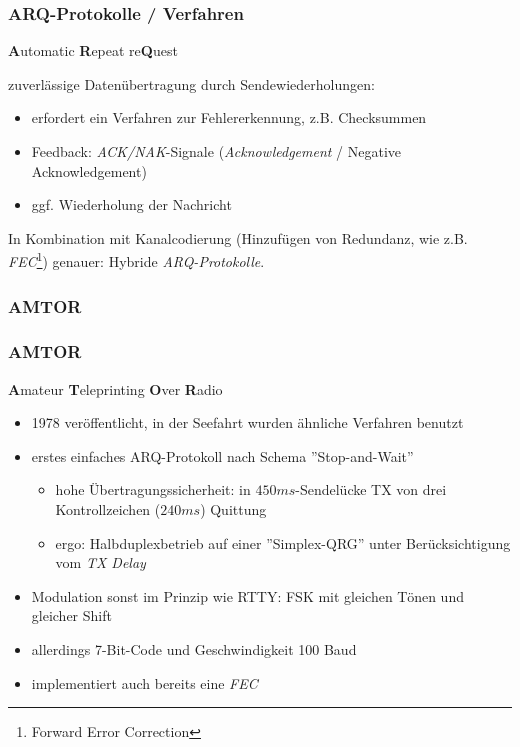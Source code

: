 \begin{frame}
    \frametitle{ARQ-Protokolle / Verfahren}

    \textbf{A}utomatic \textbf{R}epeat re\textbf{Q}uest

    zuverlässige Datenübertragung durch Sendewiederholungen:

    \begin{itemize}
        \item erfordert ein Verfahren zur Fehlererkennung, z.B. Checksummen
        \item Feedback: \emph{ACK/NAK}-Signale (\emph{Acknowledgement} / {Negative Acknowledgement})
        \item ggf. Wiederholung der Nachricht
    \end{itemize}

    In Kombination mit Kanalcodierung (Hinzufügen von Redundanz, wie z.B.
    \emph{FEC}\footnote{Forward Error Correction}) genauer: Hybride \emph{ARQ-Protokolle}.

\end{frame}

\subsubsection{AMTOR}

\begin{frame}
    \frametitle{AMTOR}

    \textbf{A}mateur \textbf{T}eleprinting \textbf{O}ver \textbf{R}adio

    \begin{itemize}
        \item 1978 veröffentlicht, in der Seefahrt wurden ähnliche Verfahren benutzt
        \item erstes einfaches ARQ-Protokoll nach Schema ''Stop-and-Wait''
        \begin{itemize}
            \item hohe Übertragungssicherheit: in $450ms$-Sendelücke TX von drei
                  Kontrollzeichen ($240ms$) Quittung
            \item ergo: Halbduplexbetrieb auf einer ''Simplex-QRG'' unter
                  Berücksichtigung vom \emph{TX Delay}
        \end{itemize}
        \item Modulation sonst im Prinzip wie RTTY: FSK mit gleichen Tönen und gleicher Shift
        \item allerdings 7-Bit-Code und Geschwindigkeit 100 Baud
        \item implementiert auch bereits eine \emph{FEC}
    \end{itemize}

\end{frame}

